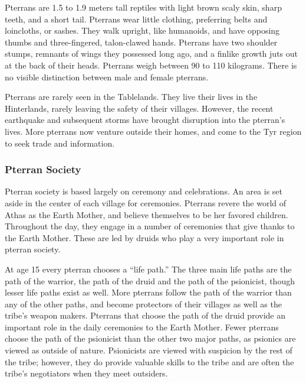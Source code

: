 Pterrans are 1.5 to 1.9 meters tall reptiles with light brown scaly skin, sharp teeth, and a short tail. Pterrans wear little clothing, preferring belts and loincloths, or sashes. They walk upright, like humanoids, and have opposing thumbs and three-fingered, talon-clawed hands. Pterrans have two shoulder stumps, remnants of wings they possessed long ago, and a finlike growth juts out at the back of their heads. Pterrans weigh between 90 to 110 kilograms. There is no visible distinction between male and female pterrans.

Pterrans are rarely seen in the Tablelands. They live their lives in the Hinterlands, rarely leaving the safety of their villages. However, the recent earthquake and subsequent storms have brought disruption into the pterran's lives. More pterrans now venture outside their homes, and come to the Tyr region to seek trade and information.


\subsubsection{Pterran Society}
Pterran society is based largely on ceremony and celebrations. An area is set aside in the center of each village for ceremonies. Pterrans revere the world of Athas as the Earth Mother, and believe themselves to be her favored children. Throughout the day, they engage in a number of ceremonies that give thanks to the Earth Mother. These are led by druids who play a very important role in pterran society.


At age 15 every pterran chooses a ``life path.'' The three main life paths are the path of the warrior, the path of the druid and the path of the psionicist, though lesser life paths exist as well. More pterrans follow the path of the warrior than any of the other paths, and become protectors of their villages as well as the tribe's weapon makers. Pterrans that choose the path of the druid provide an important role in the daily ceremonies to the Earth Mother. Fewer pterrans choose the path of the psionicist than the other two major paths, as psionics are viewed as outside of nature. Psionicists are viewed with suspicion by the rest of the tribe; however, they do provide valuable skills to the tribe and are often the tribe's negotiators when they meet outsiders.

